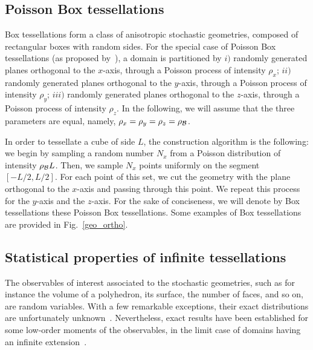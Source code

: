 \documentclass[final,authoryear,5p,times,twocolumn]{elsarticle}
\begin{document}
\subsection{Poisson Box tessellations}
\label{box}

Box tessellations form a class of anisotropic stochastic geometries, composed of rectangular boxes with random sides. For the special case of Poisson Box tessellations (as proposed by~\cite{miles1972}), a domain is partitioned by $i)$ randomly generated planes orthogonal to the $x$-axis, through a Poisson process of intensity $\rho_x$; $ii)$ randomly generated planes orthogonal to the $y$-axis, through a Poisson process of intensity $\rho_y$; $iii)$ randomly generated planes orthogonal to the $z$-axis, through a Poisson process of intensity $\rho_z$. In the following, we will assume that the three parameters are equal, namely, $\rho_x=\rho_y=\rho_z= \rho_{\cal B}$.

In order to tessellate a cube of side $L$, the construction algorithm is the following: we begin by sampling a random number $N_x$ from a Poisson distribution of intensity $\rho_{\cal B} L$. Then, we sample $N_x$ points uniformly on the segment $[-L/2,L/2]$. For each point of this set, we cut the geometry with the plane orthogonal to the $x$-axis and passing through this point. We repeat this process for the $y$-axis and the $z$-axis. For the sake of conciseness, we will denote by Box tessellations these Poisson Box tessellations. Some examples of Box tessellations are provided in Fig.~\ref{geo_ortho}. 

\subsection{Statistical properties of infinite tessellations}

The observables of interest associated to the stochastic geometries, such as for instance the volume of a polyhedron, its surface, the number of faces, and so on, are random variables. With a few remarkable exceptions, their exact distributions are unfortunately unknown~\cite{santalo}. Nevertheless, exact results have been established for some low-order moments of the observables, in the limit case of domains having an infinite extension~\cite{santalo, kendall, miles1970}.
\end{document}
